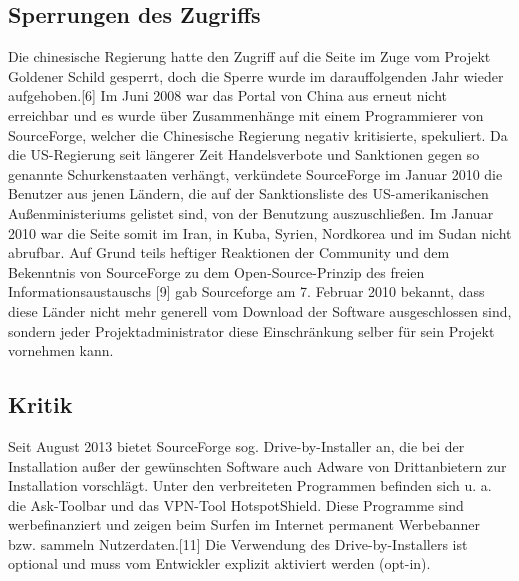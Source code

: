 \subsection{Sperrungen des Zugriffs}
Die chinesische Regierung hatte den Zugriff auf die Seite im Zuge vom Projekt Goldener Schild gesperrt, 
doch die Sperre wurde im darauffolgenden Jahr wieder aufgehoben.[6] Im Juni 2008 war das Portal von China 
aus erneut nicht erreichbar und es wurde über Zusammenhänge mit einem Programmierer von SourceForge, 
welcher die Chinesische Regierung negativ kritisierte, spekuliert. 
Da die US-Regierung seit längerer Zeit Handelsverbote und Sanktionen gegen so genannte Schurkenstaaten 
verhängt, verkündete SourceForge im Januar 2010 die Benutzer aus jenen Ländern, die auf der 
Sanktionsliste des US-amerikanischen Außenministeriums gelistet sind, von der Benutzung auszuschließen. 
Im Januar 2010 war die Seite somit im Iran, in Kuba, Syrien, Nordkorea und im Sudan nicht 
abrufbar. Auf Grund teils heftiger Reaktionen der Community und dem Bekenntnis von SourceForge zu 
dem Open-Source-Prinzip des freien Informationsaustauschs [9] gab Sourceforge am 7. Februar 2010 bekannt, 
dass diese Länder nicht mehr generell vom Download der Software ausgeschlossen sind, sondern 
jeder Projektadministrator diese Einschränkung selber für sein Projekt vornehmen kann.
\subsection{Kritik}
Seit August 2013 bietet SourceForge sog. Drive-by-Installer an, die bei der Installation 
außer der gewünschten Software auch Adware von Drittanbietern zur Installation vorschlägt. 
Unter den verbreiteten Programmen befinden sich u. a. die Ask-Toolbar und das VPN-Tool HotspotShield. 
Diese Programme sind werbefinanziert und zeigen beim Surfen im Internet permanent Werbebanner bzw. 
sammeln Nutzerdaten.[11] Die Verwendung des Drive-by-Installers ist optional und muss vom Entwickler 
explizit aktiviert werden (opt-in).

